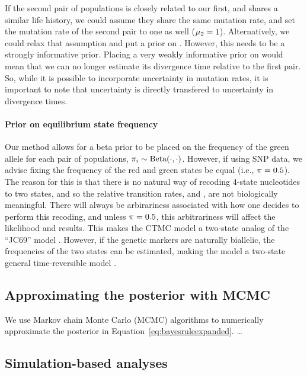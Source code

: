 If the second pair of populations is closely related to our first, and shares a
similar life history, we could assume they share the same mutation rate, and
set the mutation rate of the second pair to one as well ($\murate[2] = 1$).
Alternatively, we could relax that assumption and put a prior on \murate[2].
However, this needs to be a strongly informative prior.
Placing a very weakly informative prior on \murate[2] would mean that we can no
longer estimate its divergence time relative to the first pair.
So, while it is possible to incorporate uncertainty in mutation rates, it is
important to note that uncertainty is directly transfered to uncertainty in
divergence times.

\paragraph{Prior on equilibrium state frequency}
Our method allows for a beta prior to be placed on the frequency of the green
allele for each pair of populations,
$\gfreq[i] \sim \textrm{Beta}(\cdot, \cdot)$.
However, if using SNP data, we advise fixing the frequency of the red and green
states be equal (i.e., $\gfreq = 0.5$).
The reason for this is that there is no natural way of recoding 4-state
nucleotides to two states, and so the relative transition rates, \rgmurate and
\grmurate, are not biologically meaningful.
There will always be arbirariness associated with how one decides to perform
this recoding, and unless $\gfreq = 0.5$, this arbitrariness will affect the
likelihood and results.
This makes the CTMC model a two-state analog of the ``JC69'' model
\citep{JC1969}.
However, if the genetic markers are naturally biallelic, the frequencies of the
two states can be estimated, making the model a two-state general
time-reversible model \citep{Tavare1986}.

\subsection{Approximating the posterior with MCMC}

We use Markov chain Monte Carlo (MCMC) algorithms to numerically approximate
the posterior in Equation~\ref{eq:bayesruleexpanded}.
\ldots


\subsection{Simulation-based analyses}

